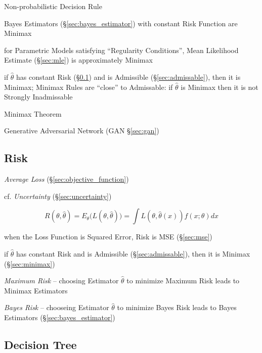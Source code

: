 Non-probabilistic Decision Rule

Bayes Estimators (\S\ref{sec:bayes_estimator}) with constant Risk Function are
Minimax

for Parametric Models satisfying ``Regularity Conditions'', Mean Likelihood
Estimate (\S\ref{sec:mle}) is approximately Minimax

if $\hat{\theta}$ has constant Risk (\S\ref{sec:risk}) and is Admissible
(\S\ref{sec:admissable}), then it is Minimax;
Minimax Rules are ``close'' to Admissable: if $\hat{\theta}$ is Minimax then it
is not Strongly Inadmissable

Minimax Theorem

Generative Adversarial Network (GAN \S\ref{sec:gan})



\subsection{Risk}\label{sec:risk}

\emph{Average Loss} (\S\ref{sec:objective_function})

cf. \emph{Uncertainty} (\S\ref{sec:uncertainty})

\[
  R(\theta,\hat{\theta}) = E_\theta\Big(L(\theta,\hat{\theta})\Big) =
    \int L(\theta,\hat{\theta}(x))f(x;\theta) dx
\]

when the Loss Function is Squared Error, Risk is MSE (\S\ref{sec:mse})

if $\hat{\theta}$ has constant Risk and is Admissible (\S\ref{sec:admissable}),
then it is Minimax (\S\ref{sec:minimax})

\emph{Maximum Risk} -- choosing Estimator $\hat{\theta}$ to minimize Maximum
Risk leads to Minimax Estimators

\emph{Bayes Risk} -- chooseing Estimator $\hat{\theta}$ to minimize Bayes Risk
leads to Bayes Estimators (\S\ref{sec:bayes_estimator})



\subsection{Decision Tree}\label{sec:decision_tree}

